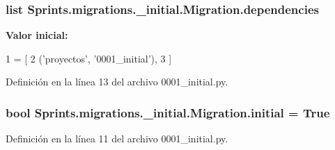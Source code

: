 \subsubsection[{\texorpdfstring{dependencies}{dependencies}}]{\setlength{\rightskip}{0pt plus 5cm}list Sprints.\+migrations.\+\_\+initial.\+Migration.\+dependencies\hspace{0.3cm}{\ttfamily [static]}}\hypertarget{class_sprints_1_1migrations_1_10001__initial_1_1_migration_a88d3ca1bdd26753226e2336ff0f591cf}{}\label{class_sprints_1_1migrations_1_10001__initial_1_1_migration_a88d3ca1bdd26753226e2336ff0f591cf}
{\bfseries Valor inicial\+:}
\begin{DoxyCode}
1 = [
2         (\textcolor{stringliteral}{'proyectos'}, \textcolor{stringliteral}{'0001\_initial'}),
3     ]
\end{DoxyCode}


Definición en la línea 13 del archivo 0001\+\_\+initial.\+py.

\subsubsection[{\texorpdfstring{initial}{initial}}]{\setlength{\rightskip}{0pt plus 5cm}bool Sprints.\+migrations.\+\_\+initial.\+Migration.\+initial = True\hspace{0.3cm}{\ttfamily [static]}}\hypertarget{class_sprints_1_1migrations_1_10001__initial_1_1_migration_a6933255dcf8717f6fe79f46a84e3889a}{}\label{class_sprints_1_1migrations_1_10001__initial_1_1_migration_a6933255dcf8717f6fe79f46a84e3889a}


Definición en la línea 11 del archivo 0001\+\_\+initial.\+py.

